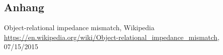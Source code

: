 \subsection*{Anhang}\label{anhang}

%
%
\begin{thebibliography}{99}
	Object-relational impedance mismatch,
	Wikipedia
	\url{https://en.wikipedia.org/wiki/Object-relational_impedance_mismatch}, 07/15/2015
	
	
	
\end{thebibliography}
